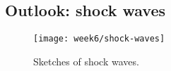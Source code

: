 \newpage
\subsection{Outlook: shock waves}
\begin{figure}[!h]
    \centering
    \texttt{[image: week6/shock-waves]}\\
    \caption{Sketches of shock waves.}
    \label{fig:shock-waves}
\end{figure}
